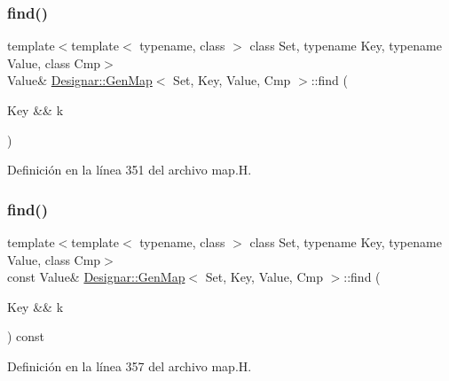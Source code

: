 \subsubsection{\texorpdfstring{find()}{find()}\hspace{0.1cm}{\footnotesize\ttfamily [3/4]}}
{\footnotesize\ttfamily template$<$template$<$ typename, class $>$ class Set, typename Key, typename Value, class Cmp$>$ \\
Value\& \hyperlink{class_designar_1_1_gen_map}{Designar\+::\+Gen\+Map}$<$ Set, Key, Value, Cmp $>$\+::find (\begin{DoxyParamCaption}\item[{Key \&\&}]{k }\end{DoxyParamCaption})\hspace{0.3cm}{\ttfamily [inline]}}



Definición en la línea 351 del archivo map.\+H.

\mbox{\label{class_designar_1_1_gen_map_a746797ad728a5e2aeefee11a8732a48f}} 
\subsubsection{\texorpdfstring{find()}{find()}\hspace{0.1cm}{\footnotesize\ttfamily [4/4]}}
{\footnotesize\ttfamily template$<$template$<$ typename, class $>$ class Set, typename Key, typename Value, class Cmp$>$ \\
const Value\& \hyperlink{class_designar_1_1_gen_map}{Designar\+::\+Gen\+Map}$<$ Set, Key, Value, Cmp $>$\+::find (\begin{DoxyParamCaption}\item[{Key \&\&}]{k }\end{DoxyParamCaption}) const\hspace{0.3cm}{\ttfamily [inline]}}



Definición en la línea 357 del archivo map.\+H.

\mbox{\label{class_designar_1_1_gen_map_a33a00f9275b3ff7788bbd93c39c25c9f}} 
